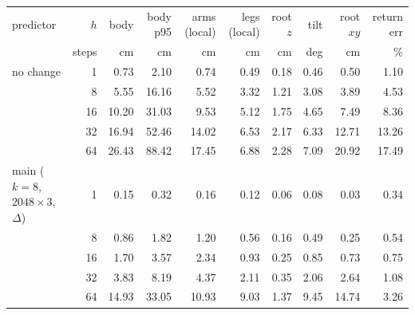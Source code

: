 \begin{tabular}{lrrrrrrrrr}\toprule
predictor & $h$ & body & body p95 & arms (local) & legs (local) & root $z$ & tilt & root $xy$ & return err \\
 & steps & cm & cm & cm & cm & cm & deg & cm & \% \\\midrule
no change & 1 & 0.73 & 2.10 & 0.74 & 0.49 & 0.18 & 0.46 & 0.50 & 1.10 \\
 & 8 & 5.55 & 16.16 & 5.52 & 3.32 & 1.21 & 3.08 & 3.89 & 4.53 \\
 & 16 & 10.20 & 31.03 & 9.53 & 5.12 & 1.75 & 4.65 & 7.49 & 8.36 \\
 & 32 & 16.94 & 52.46 & 14.02 & 6.53 & 2.17 & 6.33 & 12.71 & 13.26 \\
 & 64 & 26.43 & 88.42 & 17.45 & 6.88 & 2.28 & 7.09 & 20.92 & 17.49 \\
\midrule
main ($k{=}8$, $2048{\times}3$, $\Delta$) & 1 & 0.15 & 0.32 & 0.16 & 0.12 & 0.06 & 0.08 & 0.03 & 0.34 \\
 & 8 & 0.86 & 1.82 & 1.20 & 0.56 & 0.16 & 0.49 & 0.25 & 0.54 \\
 & 16 & 1.70 & 3.57 & 2.34 & 0.93 & 0.25 & 0.85 & 0.73 & 0.75 \\
 & 32 & 3.83 & 8.19 & 4.37 & 2.11 & 0.35 & 2.06 & 2.64 & 1.08 \\
 & 64 & 14.93 & 33.05 & 10.93 & 9.03 & 1.37 & 9.45 & 14.74 & 3.26 \\
\bottomrule\end{tabular}
